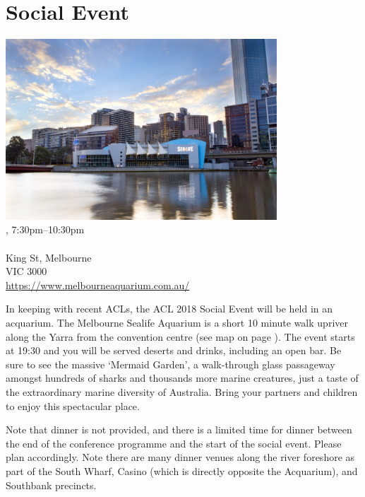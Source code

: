 \clearpage
\section[Social Event: \daydate, 7:30pm]{Social Event}
\setheaders{}{\daydateyear}

\begin{center}

\includegraphics[width=4in]{content/day2/aquarium.jpg} \\


\daydateyear, 7:30pm--10:30pm \vspace{1em}\\
\SocialLoc\\
King St, Melbourne \\
VIC 3000 \\
\url{https://www.melbourneaquarium.com.au/}
\end{center}

In keeping with recent ACLs, the ACL 2018 Social Event will be held in
an acquarium.  The Melbourne Sealife Aquarium is a short 10 minute walk upriver
along the Yarra from the convention centre (see map on page
\pageref{page:surrounds-map}). 
The event starts at 19:30 and you will be served deserts and drinks, including
an open bar.  Be sure to see the massive `Mermaid Garden', a walk-through glass
passageway amongst hundreds of sharks and thousands more marine
creatures, just a taste of the extraordinary marine diversity of
Australia. Bring your partners and children to enjoy this spectacular
place.

Note that dinner is not provided, and there is a limited time for dinner
between the end of the conference programme and the start of the social
event.  Please plan accordingly.  Note there are many dinner venues
along the river foreshore as part of the South Wharf, Casino (which is
directly opposite the Acquarium), and Southbank precincts.
